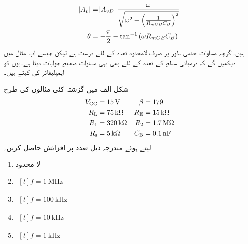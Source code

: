 \begin{gather} \label{مساوات_تعددی_ردعمل_قابو_کپیسٹر_حیطہ_اور_زاویہ}
\begin{aligned}
\abs{A_v} &=\abs{A_{vD}} \frac{\omega}{\sqrt{\omega^2 +\left(\frac{1}{R_{mCB} C_B} \right )^2}}\\
\theta&=-\frac{\pi}{2}-\tan^{-1}\left(\omega R_{mCB} C_B \right )
\end{aligned}
\end{gather}
ہیں۔اگرچہ مساوات  حتمی طور پر صرف لامحدود تعدد کے لئے درست ہے لیکن جیسے آپ مثال   میں دیکھیں گے کہ درمیانی سطح کے تعدد کے لئے بھی یہی مساوات صحیح جوابات دیتا ہے۔یوں   کو ایمپلیفائر کی  کہتے ہیں۔

 
شکل   الف میں گزشتہ کئی مثالوں کی طرح
\begin{align*} 
V_{\textup{CC}}&=\SI{15}{\volt} & \beta &=\num{179}\\ 
R_{\textup {L}}&=\SI{75}{\kilo \ohm} & R_{\textup {E}}&=\SI{15}{\kilo \ohm}\\
R_{\textup {1}}&=\SI{320}{\kilo \ohm} & R_{\textup {2}}&=\SI{1.7}{\mega \ohm}\\
R_{\textup {s}}&=\SI{5}{\kilo \ohm} & C_{\textup{B}}&=\SI{0.1}{\nano \farad}
\end{align*}
  لیتے ہوئے مندرجہ ذیل تعدد پر افزائش   حاصل کریں۔
\begin{enumerate}
\item
لا محدود
\item
$
\begin{aligned}[t]
f=\SI{1}{\mega \hertz}
\end{aligned}
$
\item
$
\begin{aligned}[t]
f=\SI{100}{\kilo \hertz}
\end{aligned}
$
\item
$
\begin{aligned}[t]
f=\SI{10}{\kilo \hertz}
\end{aligned}
$
\item
$
\begin{aligned}[t]
f=\SI{1}{\kilo \hertz}
\end{aligned}
$
\end{enumerate}

